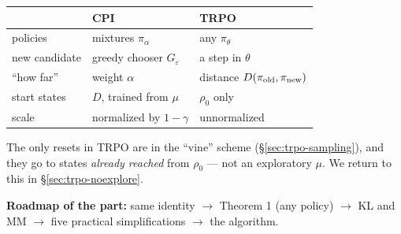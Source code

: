 \begin{minipage}[c]{0.56\linewidth}
\small
\begin{tabular}{@{}l l l@{}}
\toprule
 & \textbf{\color{AtlasWarm}CPI} & \textbf{\color{AtlasCool}TRPO} \\
\midrule
policies & mixtures $\pi_\alpha$ & any $\pi_\theta$ \\
new candidate & greedy chooser $G_\varepsilon$ & a step in $\theta$ \\
``how far'' & weight $\alpha$ & distance $D(\pi_{\mathrm{old}},\pi_{\mathrm{new}})$ \\
start states & $D$, trained from $\mu$ & $\rho_0$ only \\
scale & normalized by $1-\gamma$ & unnormalized \\
\bottomrule
\end{tabular}
\end{minipage}\hfill
\begin{minipage}[c]{0.4\linewidth}
\centering
{}
\end{minipage}

\begin{warnbox}[title={Lane B is dropped}]
The only resets in TRPO are in the ``vine'' scheme (\S\ref{sec:trpo-sampling}), and they go to states \emph{already reached} from $\rho_0$ --- not an exploratory $\mu$. We return to this in \S\ref{sec:trpo-noexplore}.
\end{warnbox}

\textbf{Roadmap of the part:} same identity $\to$ Theorem 1 (any policy) $\to$ KL and MM $\to$ five practical simplifications $\to$ the algorithm.

